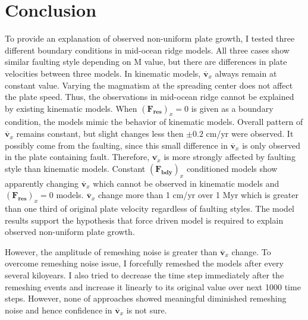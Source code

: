\documentclass[letterpaper,12pt,notitle]{memphisthesis}                     %
\begin{document}
\chapter{Conclusion}

To provide an explanation of observed non-uniform plate growth, I tested three different boundary conditions in mid-ocean ridge models. All three cases show similar faulting style depending on M value, but there are differences in plate velocities between three models. In kinematic models, $\overline{\boldsymbol{v}}_{x}$ always remain at constant value. Varying the magmatism at the spreading center does not affect the plate speed. Thus, the observations in mid-ocean ridge cannot be explained by existing kinematic models. When $(\boldsymbol{F_{res}})_x = 0$ is given as a boundary condition, the models mimic the behavior of kinematic models. Overall pattern of $\overline{\boldsymbol{v}}_{x}$ remains constant, but slight changes less then $\pm 0.2$ cm/yr were observed. It possibly come from the faulting, since this small difference in $\overline{\boldsymbol{v}}_{x}$ is only observed in the plate containing fault. Therefore, $\overline{\boldsymbol{v}_{x}}$ is more strongly affected by faulting style than kinematic models. Constant $(\boldsymbol{F_{bdy}})_x$ conditioned models show apparently changing $\overline{\boldsymbol{v}}_{x}$ which cannot be observed in kinematic models and $(\boldsymbol{F_{res}})_x = 0$ models. $\overline{\boldsymbol{v}}_{x}$ change more than 1 cm/yr over 1 Myr which is greater than one third of original plate velocity regardless of faulting styles. The model results support the hypothesis that force driven model is required to explain observed non-uniform plate growth.

However, the amplitude of remeshing noise is greater than $\overline{\boldsymbol{v}}_{x}$ change. To overcome remeshing noise issue, I forcefully remeshed the models after every several kiloyears. I also tried to decrease the time step immediately after the remeshing events and increase it linearly to its original value over next 1000 time steps. However, none of approaches showed meaningful diminished remeshing noise and hence confidence in $\overline{\boldsymbol{v}}_{x}$ is not sure.

\end{document}
